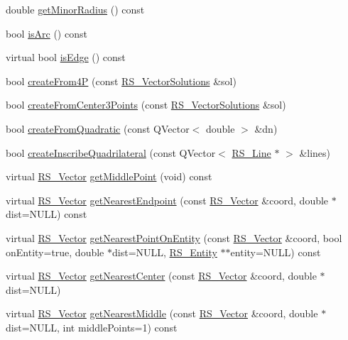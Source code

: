 \begin{DoxyCompactItemize}
\item 
double \hyperlink{classRS__Ellipse_afc81f48c4fd9dd99325913d2519f2c4a}{get\-Minor\-Radius} () const 
\item 
bool \hyperlink{classRS__Ellipse_a914417da59f3c798d3bc0d3071bb4c1e}{is\-Arc} () const 
\item 
virtual bool \hyperlink{classRS__Ellipse_ade9e9de88021253d5f4b620ccd65d63e}{is\-Edge} () const 
\item 
bool \hyperlink{classRS__Ellipse_ad3d537c105532a2ecac107ad35e3f67c}{create\-From4\-P} (const \hyperlink{classRS__VectorSolutions}{R\-S\-\_\-\-Vector\-Solutions} \&sol)
\item 
bool \hyperlink{classRS__Ellipse_a8f9bbda90bc18c848437fc7596a2911f}{create\-From\-Center3\-Points} (const \hyperlink{classRS__VectorSolutions}{R\-S\-\_\-\-Vector\-Solutions} \&sol)
\item 
bool \hyperlink{classRS__Ellipse_ae1aebc5fc6abfaa4df8572329a3f773f}{create\-From\-Quadratic} (const Q\-Vector$<$ double $>$ \&dn)
\item 
bool \hyperlink{classRS__Ellipse_aeb3c5ae5f00afcc31e86f03ae78eb331}{create\-Inscribe\-Quadrilateral} (const Q\-Vector$<$ \hyperlink{classRS__Line}{R\-S\-\_\-\-Line} $\ast$ $>$ \&lines)
\item 
virtual \hyperlink{classRS__Vector}{R\-S\-\_\-\-Vector} \hyperlink{classRS__Ellipse_a649281f07c0b5c3461268df9b1d33c63}{get\-Middle\-Point} (void) const 
\item 
virtual \hyperlink{classRS__Vector}{R\-S\-\_\-\-Vector} \hyperlink{classRS__Ellipse_ac130924fdf2fd5abacf1cc409aec86d7}{get\-Nearest\-Endpoint} (const \hyperlink{classRS__Vector}{R\-S\-\_\-\-Vector} \&coord, double $\ast$dist=N\-U\-L\-L) const 
\item 
virtual \hyperlink{classRS__Vector}{R\-S\-\_\-\-Vector} \hyperlink{classRS__Ellipse_a9ada69c7a782dfc793288300b1f5c8ec}{get\-Nearest\-Point\-On\-Entity} (const \hyperlink{classRS__Vector}{R\-S\-\_\-\-Vector} \&coord, bool on\-Entity=true, double $\ast$dist=N\-U\-L\-L, \hyperlink{classRS__Entity}{R\-S\-\_\-\-Entity} $\ast$$\ast$entity=N\-U\-L\-L) const 
\item 
virtual \hyperlink{classRS__Vector}{R\-S\-\_\-\-Vector} \hyperlink{classRS__Ellipse_ab7c5311f36cf6378a6df87613b18f31b}{get\-Nearest\-Center} (const \hyperlink{classRS__Vector}{R\-S\-\_\-\-Vector} \&coord, double $\ast$dist=N\-U\-L\-L)
\item 
virtual \hyperlink{classRS__Vector}{R\-S\-\_\-\-Vector} \hyperlink{classRS__Ellipse_a9b3d9f81dbcede17d860d51c268b42d8}{get\-Nearest\-Middle} (const \hyperlink{classRS__Vector}{R\-S\-\_\-\-Vector} \&coord, double $\ast$dist=N\-U\-L\-L, int middle\-Points=1) const 
$$
\end{DoxyCompactItemize}
